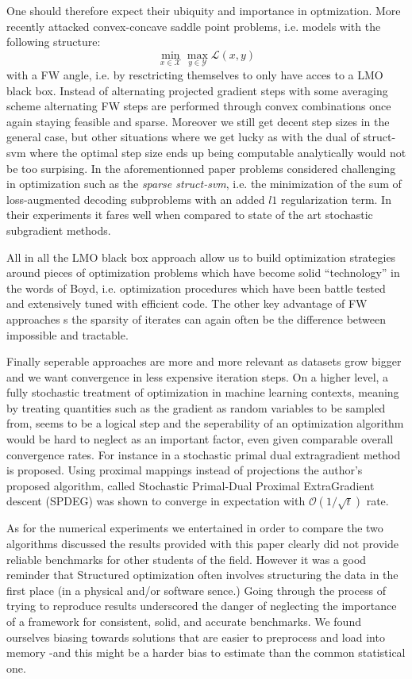 One should therefore expect their ubiquity and importance in optmization. More
recently \citet{gidelFrankWolfeAlgorithmsSaddle2016a} attacked convex-concave
saddle point problems, i.e. models with the following structure:
\begin{equation}
  \min_{x\in \mathcal X} \max_{y\in\mathcal Y} \mathcal L(x,y)
\end{equation} with a FW angle, i.e. by resctricting themselves to only have
acces to a LMO black box. Instead of alternating projected gradient steps with
some averaging scheme alternating FW steps are performed through convex
combinations once again staying feasible and sparse. Moreover we still get
decent step sizes in the general case, but other situations where we get lucky
as with the dual of struct-svm where the optimal step size ends up being
computable analytically would not be too surpising. In the aforementionned
paper problems considered challenging in optimization such as the
\emph{sparse struct-svm}, i.e. the minimization of the sum of loss-augmented
decoding subproblems with an added $l1$ regularization term. In their
experiments it fares well when compared to state of the art stochastic
subgradient methods. 

All in all the LMO black box approach allow us to build optimization strategies
around pieces of optimization problems which have become solid ``technology'' in
the words of Boyd, i.e. optimization procedures which have been battle tested
and extensively tuned with efficient code. The other key advantage of FW
approaches s the sparsity of iterates can again often be the difference between
impossible and tractable.

Finally seperable approaches are more and more relevant as datasets grow bigger
and we want convergence in less expensive iteration steps. On a higher level,
a fully stochastic treatment of optimization in machine learning contexts, meaning by
treating quantities such as the gradient as random variables to be sampled from,
seems to be a logical step and the seperability of an optimization algorithm
would be hard to neglect as an important factor, even given comparable overall
convergence rates. For instance in \citet{linStochasticPrimalDualProximal2017a}
a stochastic primal dual extragradient method is proposed. Using proximal
mappings instead of projections the author's proposed algorithm, called
Stochastic Primal-Dual Proximal ExtraGradient descent (SPDEG) was shown to
converge in expectation with $\mathcal O (1/\sqrt t)$ rate.

As for the numerical experiments we entertained in order to compare the two
algorithms discussed the results provided with this paper clearly did not
provide reliable benchmarks for other students of the field. However it was a
good reminder that Structured optimization often involves structuring the data
in the first place (in a physical and/or software sence.) Going through the
process of trying to reproduce results underscored the danger of neglecting the
importance of a framework for consistent, solid, and accurate benchmarks. We
found ourselves biasing towards solutions that are easier to preprocess and load
into memory
 -and this might be a harder bias to estimate than the common
statistical one. %
